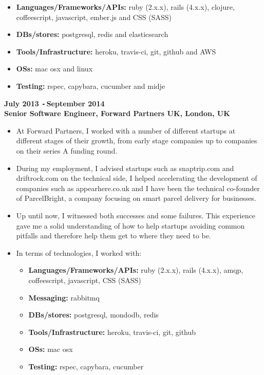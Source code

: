 \documentclass{res}
\def\Minus{\texttt{-}\,}
\begin{document}
\begin{resume}
\begin{itemize}
      \begin{itemize}
        \item[] {\bf Languages/Frameworks/APIs:} ruby (2.x.x), rails
          (4.x.x), clojure, coffeescript, javascript, ember.js and CSS (SASS)
        \item[] {\bf DBs/stores:} postgresql, redis and elasticsearch
        \item[] {\bf Tools/Infrastructure:} heroku, travis-ci, git, github and
          AWS
        \item[] {\bf OSs:} mac osx and linux
        \item[] {\bf Testing:} rspec, capybara, cucumber and midje
      \end{itemize}
    \end{itemize}

  {\bf July 2013 \Minus September 2014}\\
  {\bf Senior Software Engineer, Forward Partners UK, London, UK}
    \begin{itemize}
      \item[] At Forward Partners, I worked with a number of different
        startups at different stages of their growth, from early stage companies
        up to companies on their series A funding round.
      \item[] During my employment, I advised startups such as
        snaptrip.com and driftrock.com on the technical side, I helped
        accelerating the development of companies such as appearhere.co.uk
        and I have been the technical co-founder of ParcelBright, a
        company focusing on smart parcel delivery for businesses.
      \item[] Up until now, I witnessed both successes and some failures.
        This experience gave me a solid understanding of how to help startups
        avoiding common pitfalls and therefore help them get to where they
        need to be.
      \item[] In terms of technologies, I worked with:
      \begin{itemize}
        \item[] {\bf Languages/Frameworks/APIs:} ruby (2.x.x), rails
          (4.x.x), amqp, coffeescript, javascript, CSS (SASS)
        \item[] {\bf Messaging:} rabbitmq
        \item[] {\bf DBs/stores:} postgresql, mondodb, redis
        \item[] {\bf Tools/Infrastructure:} heroku, travis-ci, git, github
        \item[] {\bf OSs:} mac osx
        \item[] {\bf Testing:} rspec, capybara, cucumber
      \end{itemize}
    \end{itemize}


\end{resume}
\end{document}
